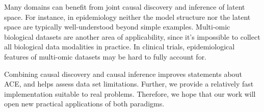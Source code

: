 \documentclass{article}
\begin{document}
Many domains can benefit from joint causal discovery and inference of latent space.  For instance, in epidemiology neither the model structure nor the latent space are typically well-understood beyond simple examples.  Multi-omic biological datasets are another area of applicability, since it's impossible to collect all biological data modalities in practice.  In clinical trials, epidemiological features of multi-omic datasets may be hard to fully account for.  

Combining causal discovery and causal inference improves statements about ACE, and helps assess data set limitations.  Further, we provide a relatively fast implementation suitable to real problems.  Therefore, we hope that our work will open new practical applications of both paradigms.
 
\clearpage
\small


\end{document}
